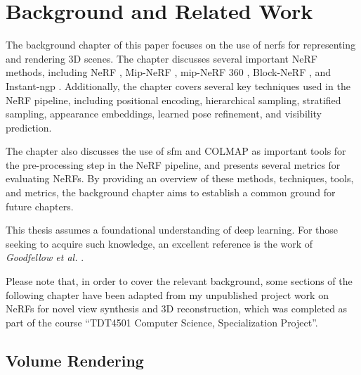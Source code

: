 \chapter{Background and Related Work} \label{chap:relatedwork}

The background chapter of this paper focuses on the use of \acrshort{nerf}s for representing and rendering 3D scenes. The chapter discusses several important NeRF methods, including NeRF \cite{mildenhall_nerf_2020}, Mip-NeRF \cite{barron_mip-nerf_2021}, mip-NeRF 360 \cite{barron_mip-nerf_2022}, Block-NeRF \cite{tancik_block-nerf_2022}, and Instant-ngp \cite{muller_instant_2022}. Additionally, the chapter covers several key techniques used in the NeRF pipeline, including positional encoding, hierarchical sampling, stratified sampling, appearance embeddings, learned pose refinement, and visibility prediction.

The chapter also discusses the use of \acrfull{sfm} and COLMAP \cite{schoenberger2016sfm} as important tools for the pre-processing step in the NeRF pipeline, and presents several metrics for evaluating NeRFs. By providing an overview of these methods, techniques, tools, and metrics, the background chapter aims to establish a common ground for future chapters.

This thesis assumes a foundational understanding of deep learning. For those seeking to acquire such knowledge, an excellent reference is the work of \textit{Goodfellow et al.} \cite{Goodfellow}.

Please note that, in order to cover the relevant background, some sections of the following chapter have been adapted from my unpublished project work on NeRFs for novel view synthesis and 3D reconstruction, which was completed as part of the course “TDT4501 Computer Science, Specialization Project”.

\section{Volume Rendering} \label{sec:volumerendering}

